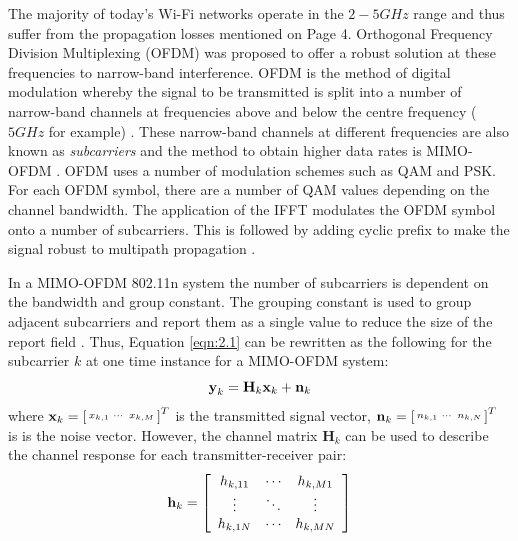 The majority of today's Wi-Fi networks operate in the $2-5GHz$ range and thus suffer from the propagation losses mentioned on Page 4. Orthogonal Frequency Division Multiplexing (OFDM) was proposed to offer a robust solution at these frequencies to narrow-band interference. OFDM is the method of digital modulation whereby the signal to be transmitted is split into a number of narrow-band channels at frequencies above and below the centre frequency ($5GHz$ for example) \citep{OFDM}.
These narrow-band channels at different frequencies are also known as \textit{subcarriers} and the method to obtain higher data rates is MIMO-OFDM \citep{802.11nStandard}. OFDM uses a number of modulation schemes such as QAM and PSK. For each OFDM symbol, there are a number of QAM values depending on the channel bandwidth. The application of the IFFT modulates the OFDM symbol onto a number of subcarriers. This is followed by adding cyclic prefix to make the signal robust to multipath propagation \citep{OFDM, 802.11nStandard}. \par

In a MIMO-OFDM 802.11n system the number of subcarriers is dependent on the bandwidth and group constant. The grouping constant is used to group adjacent subcarriers and report them as a single value to reduce the size of the report field \citep{full802.11nStandard}. Thus, Equation \ref{eqn:2.1} can be rewritten as the following for the subcarrier $k$ at one time instance for a MIMO-OFDM system:
\vspace{-11pt}
\begin{equation}\label{eqn:2.2}
    \textbf{y}_k = \textbf{H}_k\textbf{x}_k+\textbf{n}_k
    \vspace{-11pt}
\end{equation}
where $\textbf{x}_k = \begin{bsmallmatrix}x_{k,1} & \cdots & x_{k,M}\end{bsmallmatrix}^T$ is the transmitted signal vector, $\textbf{n}_k = \begin{bsmallmatrix}n_{k,1} & \cdots & n_{k,N}\end{bsmallmatrix}^T$ is is the noise vector. However, the channel matrix $\textbf{H}_{k}$ can be used to describe the channel response for each transmitter-receiver pair: 
\vspace{-11pt}
\begin{equation}\label{eqn:2.3}
\textbf{h}_{k}=\left[
\begin{array}{ccc}
    h_{k,11} & \cdots & h_{k,M1} \\
   \vdots & \ddots & \vdots \\
    h_{k,1N} & \cdots & h_{k,MN}
\end{array}
\right]
\vspace{-11pt}
\end{equation}
